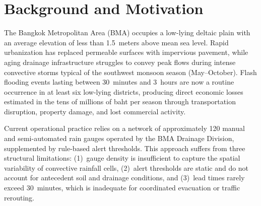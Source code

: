 \section{Background and Motivation}
The Bangkok Metropolitan Area (BMA) occupies a low-lying deltaic plain with an average elevation of less than 1.5~meters above mean sea level. Rapid urbanization has replaced permeable surfaces with impervious pavement, while aging drainage infrastructure struggles to convey peak flows during intense convective storms typical of the southwest monsoon season (May--October). Flash flooding events lasting between 30~minutes and 3~hours are now a routine occurrence in at least six low-lying districts, producing direct economic losses estimated in the tens of millions of baht per season through transportation disruption, property damage, and lost commercial activity.

\noindent
Current operational practice relies on a network of approximately 120 manual and semi-automated rain gauges operated by the BMA Drainage Division, supplemented by rule-based alert thresholds. This approach suffers from three structural limitations: (1)~gauge density is insufficient to capture the spatial variability of convective rainfall cells, (2)~alert thresholds are static and do not account for antecedent soil and drainage conditions, and (3)~lead times rarely exceed 30~minutes, which is inadequate for coordinated evacuation or traffic rerouting.
